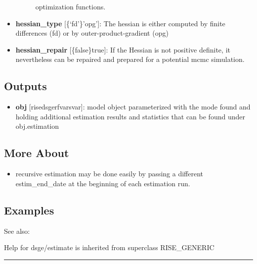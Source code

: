 \documentclass[letterpaper,10pt,english]{sphinxmanual}
\begin{document}
\begin{itemize}
\begin{description}
\begin{itemize}
\end{itemize}

optimization functions.

\end{description}

\item {} 
\textbf{hessian\_type} {[}\{`fd'\}\textbar{}'opg'{]}: The hessian is either computed by
finite differences (fd) or by outer-product-gradient (opg)

\item {} 
\textbf{hessian\_repair} {[}\{false\}\textbar{}true{]}: If the Hessian is not positive
definite, it nevertheless can be repaired and prepared for a potential
mcmc simulation.

\end{itemize}


\subsection{Outputs}
\label{classes/models/@dsge/dsge:id40}\begin{itemize}
\item {} 
\textbf{obj} {[}rise\textbar{}dsge\textbar{}rfvar\textbar{}svar{]}: model object parameterized with the
mode found and holding additional estimation results and statistics
that can be found under obj.estimation

\end{itemize}


\subsection{More About}
\label{classes/models/@dsge/dsge:id41}\begin{itemize}
\item {} 
recursive estimation may be done easily by passing a different
estim\_end\_date at the beginning of each estimation run.

\end{itemize}


\subsection{Examples}
\label{classes/models/@dsge/dsge:id42}
See also:

Help for dsge/estimate is inherited from superclass RISE\_GENERIC


\bigskip\hrule{}\bigskip
\end{document}

